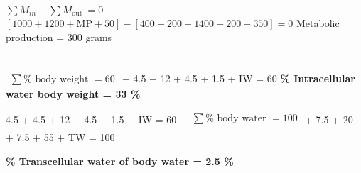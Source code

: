 \documentclass[../main.tex]{subfiles}
\begin{document}
\begin{enumerate}[label=\bfseries(\alph*)]
$\sum M_{i n}-\sum M_{\text {out }}=0$
\bigbreak
$[1000+1200+\mathrm{MP}+50]-[400+200+1400+200+350]=0$
\bigbreak
Metabolic production = 300 grams

\section{ }
$
\begin{aligned}
\sum \%  \text { body weight }= 60
\end{aligned}
$
 + 4.5 + 12 + 4.5 + 1.5 + IW = 60
\bigbreak
\textbf{\% Intracellular water body weight = 33 \%}
\bigbreak

4.5 + 4.5 + 12 + 4.5 + 1.5 + IW = 60
\bigbreak
$
\begin{aligned}
&\sum \% \text { body water } = 100 \\ 
\end{aligned}
$
 + 7.5 + 20 + 7.5 + 55 + TW = 100

\bigbreak
\textbf{\% Transcellular water of body water = 2.5 \%}


\end{enumerate}
\end{document}
